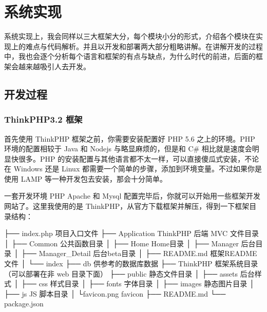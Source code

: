 \chapter{系统实现}
\label{cha:system-implementation}

系统实现上，我会同样以三大框架大分，每个模块小分的形式，介绍各个模块在实现上的难点与代码解析。并且以开发和部署两大部分粗略讲解。在讲解开发的过程中，我也会逐个分析每个语言和框架的有点与缺点，为什么时代的前进，后面的框架会越来越吸引人去开发。

\section{开发过程}
\label{sec:development-process}

\subsection{ThinkPHP3.2 框架}

首先使用 ThinkPHP 框架之前，你需要安装配置好 PHP 5.6 之上的环境。PHP 环境的配置相较于 Java 和 Nodejs 与略显麻烦的，但是和 C\# 相比就是速度会明显快很多。PHP 的安装配置与其他语言都不太一样，可以直接傻瓜式安装，不论在 Windows 还是 Linux 都需要一个简单的步骤，添加到环境变量。不过如果你是使用 LAMP 等一种开发包去安装，那会十分简单。

一套开发环境 PHP Apache 和 Mysql 配置完毕后，你就可以开始用一些框架开发网站了。这里我使用的是 ThinkPHP，从官方下载框架并解压，得到一下框架目录结构：

\begin{code}
├── index.php           项目入口文件
├── Application         ThinkPHP 后端 MVC 文件目录
│   ├── Common          公共函数目录
│   ├── Home            Home目录
│   ├── Manager         后台目录
│   ├── Manager_Detail  后台beta目录
│   ├── README.md       框架README文件
│   └── index           
├── db                  供参考的数据库数据
├── ThinkPHP            框架系统目录（可以部署在非 web 目录下面）
├── public              静态文件目录
│   ├── assets          后台样式
│   ├── css             样式目录
│   ├── fonts           字体目录
│   ├── images          静态图片目录
│   ├── js              JS 脚本目录
│   └favicon.png        favicon
├── README.md
└── package.json
\end{code}

